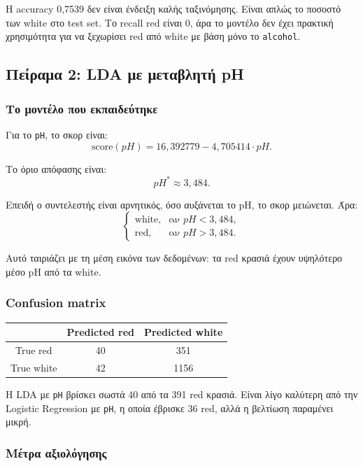 \documentclass[11pt,a4paper]{article}
\newcommand{\code}[1]{\texttt{#1}}
\begin{document}
Η accuracy 0,7539 δεν είναι ένδειξη καλής ταξινόμησης. Είναι απλώς το
ποσοστό των white στο test set. Το recall red είναι 0, άρα το μοντέλο δεν
έχει πρακτική χρησιμότητα για να ξεχωρίσει red από white με βάση μόνο το
\code{alcohol}.

\subsection{Πείραμα 2: LDA με μεταβλητή pH}

\subsubsection{Το μοντέλο που εκπαιδεύτηκε}

Για το \code{pH}, το σκορ είναι:
\[
\text{score}(pH) =
16{,}392779 - 4{,}705414 \cdot pH.
\]

Το όριο απόφασης είναι:
\[
pH^* \approx 3{,}484.
\]

Επειδή ο συντελεστής είναι αρνητικός, όσο αυξάνεται το pH, το σκορ μειώνεται.
Άρα:
\[
\begin{cases}
\text{white}, & \text{αν } pH < 3{,}484,\\
\text{red}, & \text{αν } pH > 3{,}484.
\end{cases}
\]

Αυτό ταιριάζει με τη μέση εικόνα των δεδομένων: τα red κρασιά έχουν υψηλότερο
μέσο pH από τα white.

\subsubsection{Confusion matrix}

\begin{center}
\begin{tabular}{c|cc}
\toprule
 & Predicted red & Predicted white \\
\midrule
True red & 40 & 351 \\
True white & 42 & 1156 \\
\bottomrule
\end{tabular}
\end{center}

Η LDA με \code{pH} βρίσκει σωστά 40 από τα 391 red κρασιά. Είναι λίγο καλύτερη
από την Logistic Regression με \code{pH}, η οποία έβρισκε 36 red, αλλά η
βελτίωση παραμένει μικρή.

\subsubsection{Μέτρα αξιολόγησης}
\end{document}
